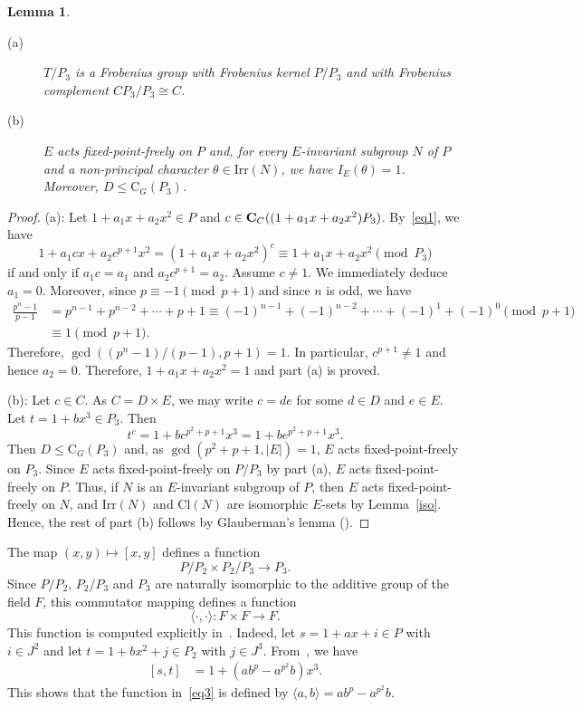 \documentclass{amsart}
\newtheorem{lemma}[theorem]{Lemma}
\def\cent#1#2{\mathrm{C}_{{#1}}{{(#2)}}}
\def\irr#1{\mathrm{Irr}(#1)}
\def\cl#1{\mathrm{Cl}(#1)}
\begin{document}
\begin{lemma}\label{lemma:frobenius}
  \begin{description}
  \item[(a)] $T/P_3$ is a Frobenius group with Frobenius kernel $P/P_3$ and with Frobenius complement $CP_3/P_3\cong C$.
  \item[(b)]  $E$ acts fixed-point-freely on $P$ and, for every $E$-invariant subgroup $N$ of $P$ and a non-principal character $\theta \in \irr N$, we have
    $I_E(\theta) = 1$. Moreover, $D \leq \cent G{P_3}$.
  \end{description}
\end{lemma}
\begin{proof}
  (a): Let $1+a_1x+a_2x^2\in P$ and $c\in {\bf C}_C((1+a_1x+a_2x^2)P_3)$.  By~\eqref{eq1}, we have $$1+a_1cx+a_2c^{p+1}x^2=(1+a_1x+a_2x^2)^c\equiv 1+a_1x+a_2x^2\pmod {P_3}$$
if and only if $a_1 c=a_1$ and $a_2c^{p+1}=a_2$. Assume $c\ne 1$. We immediately deduce $a_1=0$. Moreover, since $p\equiv -1\pmod{p+1}$ and since $n$ is odd, we have
\begin{align*}
\frac{p^{n}-1}{p-1}&=p^{n-1}+p^{n-2}+\cdots+p+1\equiv(-1)^{n-1}+(-1)^{n-2}+\cdots+(-1)^1+(-1)^0\pmod{p+1}\\
&\equiv 1\pmod {p+1}.
\end{align*}
Therefore, $\gcd((p^n-1)/(p-1),p+1)=1$. In particular, $c^{p+1}\ne 1$ and hence $a_2=0$. Therefore,  $1+a_1x+a_2x^2= 1$ and part (a) is proved.

\smallskip
(b): Let $c\in C$. As $C= D\times E$, we may write $c=de$ for some $d\in D$ and $e\in E$. Let $t=1+b x^3\in P_3$. Then
$$t^c=1+b c^{p^2+p+1}x^3=1+b e^{p^2+p+1} x^3.$$
Then $D \leq \cent G{P_3}$ and, as $\gcd(p^2+p+1,|E|)=1$, $E$ acts fixed-point-freely on $P_3$.
  Since $E$ acts fixed-point-freely on
$P/P_3$ by part (a), $E$ acts fixed-point-freely on $P$.
Thus, if  $N$ is an $E$-invariant subgroup of $P$, then  $E$ acts fixed-point-freely on $N$,  and $\irr N$ and $\cl N$ are isomorphic
$E$-sets by Lemma~\ref{iso}.
Hence, the rest of part (b) follows by Glauberman's lemma (\cite[Lemma~13.8]{isaacs}).
\end{proof}

The map $(x,y)\mapsto [x,y]$ defines a function $$P/P_2\times P_2/P_3\to P_3.$$
Since $P/P_2$, $P_2/P_3$ and $P_3$ are naturally isomorphic to the additive group of the field $F$, this commutator mapping defines a function
\begin{equation}\label{eq3}\langle\cdot,\cdot \rangle:F\times F\to F.
\end{equation} This function is computed explicitly in~\cite{isaacs1}. Indeed,
let $s=1+a x+i\in P$ with $i\in J^2$ and let $t=1+b x^2+j\in P_2$ with $j\in J^3$. From~\cite[Corollary~4.2]{isaacs1}, we have
\begin{align}\label{eq:5}
[s,t]&=1+(ab^p-a^{p^2}b)x^3.
\end{align}
This shows that the function in~\eqref{eq3} is defined by $\langle a,b\rangle=ab^p-a^{p^2}b$.
\end{document}
